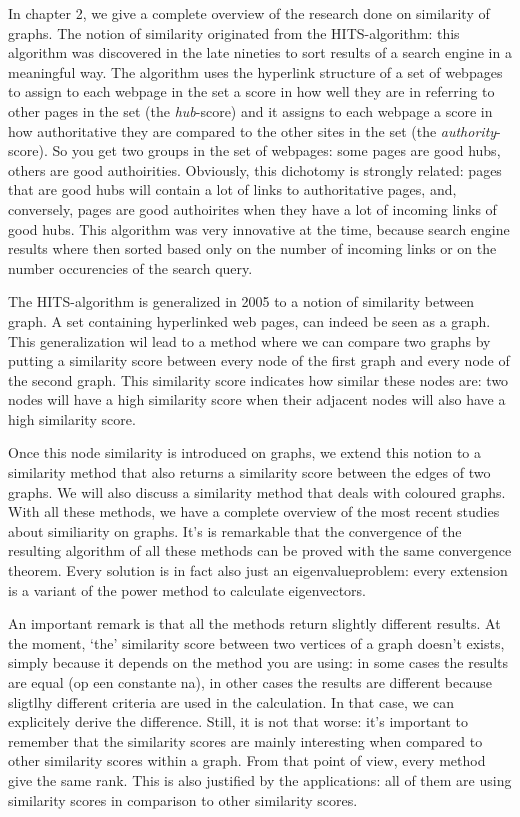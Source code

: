 \documentclass[a4paper,11pt]{report}
\begin{document}
In chapter 2, we give a complete overview of the research done on similarity of 
graphs. The notion of similarity originated from the HITS-algorithm: this 
algorithm was discovered in the late nineties to sort results of a search 
engine in a meaningful way. The algorithm uses the hyperlink structure of a set 
of webpages to assign to each webpage in the set a score in how well they are in referring to other pages
in the set (the \emph{hub}-score)  and it assigns to each webpage a score in how 
authoritative they are compared to the other sites in the set (the 
\emph{authority}-score). So you get two groups in the set of webpages: some pages are good hubs, others are good
authoirities. Obviously, this dichotomy is strongly related: pages that are good 
hubs will contain a lot of links to authoritative pages, and, conversely, pages 
are good authoirites when they have a lot of incoming links of good hubs. This 
algorithm was very innovative at the time, because search engine results where 
then sorted based only on the number of incoming links or on the number 
occurencies of the search query.

The HITS-algorithm is generalized in 2005 to a notion of similarity between 
graph. A set containing hyperlinked web pages, can indeed be seen as a graph. 
This generalization wil lead to a method where we can compare two graphs by putting a similarity score
between every node of the first graph and every node of the second graph. This similarity score 
indicates how similar these nodes are: two nodes will have a high similarity 
score when their adjacent nodes will also have a high similarity score. 

Once this node similarity is introduced on graphs, we extend this notion to a 
similarity method that also returns a similarity score between the edges of two 
graphs. We will also discuss a similarity method that deals with coloured 
graphs. With all these methods, we have a complete overview of the most recent 
studies about similiarity on graphs. It's is remarkable that the convergence of 
the resulting algorithm of all these methods can be proved with the same 
convergence theorem. Every solution is in fact also just an eigenvalueproblem: 
every extension is a variant of the power method to calculate eigenvectors.

An important remark is that all the methods return slightly different results. 
At the moment, `the' similarity score between two vertices of a graph doesn't 
exists, simply because it depends on the method you are using: in some cases the 
results are equal (op een constante na), in other cases the results are 
different because sligtlhy different criteria are used in the calculation. In 
that case, we can explicitely derive the difference.
Still, it is not that worse: it's important to remember that the similarity 
scores are mainly interesting when compared to other similarity scores within a graph. From that point of view,
every method give the same rank. This is also justified by the applications: all 
of them are using similarity scores in comparison to other similarity scores. 
\end{document}
